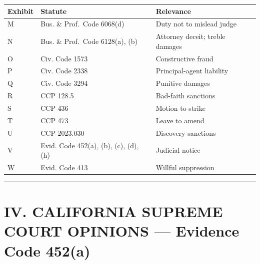 {\def\LTcaptype{table} %
\begin{longtable}[]{@{}
  >{\raggedright\arraybackslash}p{}
  >{\raggedright\arraybackslash}p{}
  >{\raggedright\arraybackslash}p{}@{}}
\toprule\noalign{}
\begin{minipage}[b]{\linewidth}\raggedright
Exhibit
\end{minipage} & \begin{minipage}[b]{\linewidth}\raggedright
Statute
\end{minipage} & \begin{minipage}[b]{\linewidth}\raggedright
Relevance
\end{minipage} \\
\midrule\noalign{}
\endhead
\bottomrule\noalign{}
\endlastfoot
M & Bus. \& Prof.~Code \textsection{} 6068(d) & Duty not to mislead judge \\
N & Bus. \& Prof.~Code \textsection{} 6128(a), (b) & Attorney deceit; treble damages \\
O & Civ. Code \textsection{} 1573 & Constructive fraud \\
P & Civ. Code \textsection{} 2338 & Principal-agent liability \\
Q & Civ. Code \textsection{} 3294 & Punitive damages \\
R & CCP \textsection{} 128.5 & Bad-faith sanctions \\
S & CCP \textsection{} 436 & Motion to strike \\
T & CCP \textsection{} 473 & Leave to amend \\
U & CCP \textsection{} 2023.030 & Discovery sanctions \\
V & Evid. Code \textsection{} 452(a), (b), (c), (d), (h) & Judicial notice \\
W & Evid. Code \textsection{} 413 & Willful suppression \\
\end{longtable}
}

\begin{center}\rule{0.5\linewidth}{0.5pt}\end{center}

\section{IV. CALIFORNIA SUPREME COURT OPINIONS --- Evidence Code \textsection{} 452(a)}\label{iv.-california-supreme-court-opinions-evidence-code-452a}

